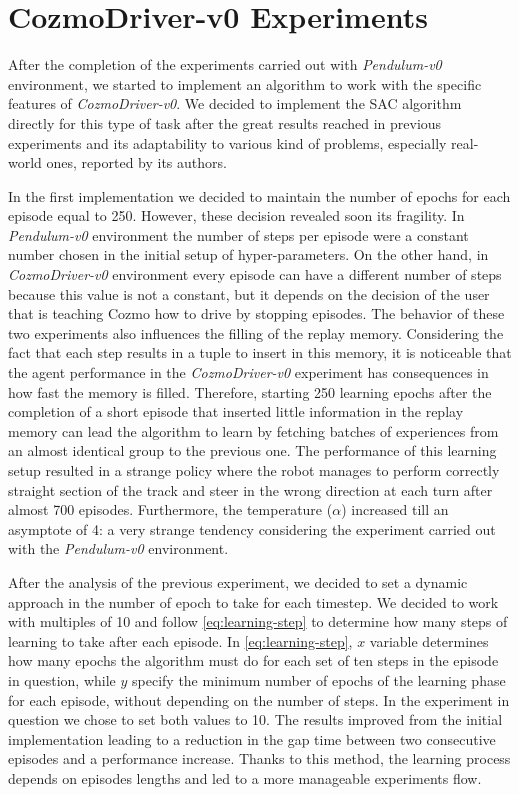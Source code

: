 \FloatBarrier

\section{CozmoDriver-v0 Experiments} \label{sec:cozmo-exp}

After the completion of the experiments carried out with \textit{Pendulum-v0} environment, we started to implement an algorithm to work with the specific features of \textit{CozmoDriver-v0}. We decided to implement the SAC algorithm directly for this type of task after the great results reached in previous experiments and its adaptability to various kind of problems, especially real-world ones, reported by its authors.

In the first implementation we decided to maintain the number of epochs for each episode equal to 250. However, these decision revealed soon its fragility. In \textit{Pendulum-v0} environment the number of steps per episode were a constant number chosen in the initial setup of hyper-parameters. On the other hand, in \textit{CozmoDriver-v0} environment every episode can have a different number of steps because this value is not a constant, but it depends on the decision of the user that is teaching Cozmo how to drive by stopping episodes. The behavior of these two experiments also influences the filling of the replay memory. Considering the fact that each step results in a tuple to insert in this memory, it is noticeable that the agent performance in the \textit{CozmoDriver-v0} experiment has consequences in how fast the memory is filled. Therefore, starting 250 learning epochs after the completion of a short episode that inserted little information in the replay memory can lead the algorithm to learn by fetching batches of experiences from an almost identical group to the previous one.
The performance of this learning setup resulted in a strange policy where the robot manages to perform correctly straight section of the track and steer in the wrong direction at each turn after almost 700 episodes. Furthermore, the temperature ($\alpha$) increased till an asymptote of 4: a very strange tendency considering the experiment carried out with the \textit{Pendulum-v0} environment.

After the analysis of the previous experiment, we decided to set a dynamic approach in the number of epoch to take for each timestep. We decided to work with multiples of 10 and follow \vref{eq:learning-step} to determine how many steps of learning to take after each episode. In \vref{eq:learning-step}, $x$ variable determines how many epochs the algorithm must do for each set of ten steps in the episode in question, while $y$ specify the minimum number of epochs of the learning phase for each episode, without depending on the number of steps. In the experiment in question we chose to set both values to 10. The results improved from the initial implementation leading to a reduction in the gap time between two consecutive episodes and a performance increase. Thanks to this method, the learning process depends on episodes lengths and led to a more manageable experiments flow.


